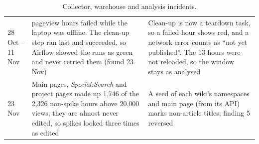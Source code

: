 \begin{table}[!h]
\begin{tabularx}{\linewidth}{l>{\raggedright\arraybackslash}X>{\raggedright\arraybackslash}X}
    28 Oct -- 11 Nov & 13 pageview hours failed while the laptop was offline. The clean-up step ran last
      and succeeded, so Airflow showed the runs as green and never retried them (found 23 Nov) & Clean-up
      is now a teardown task, so a failed hour shows red, and a network error counts as ``not yet
      published''. The 13 hours were not reloaded, so the window stays as analysed \\
    23 Nov & Main pages, \emph{Special:Search} and project pages made up 1{,}746 of the 2{,}326 non-spike
      hours above 20{,}000 views; they are almost never edited, so spikes looked three times as edited
      & A seed of each wiki's namespaces and main page (from its API) marks non-article titles; finding 5
      reversed \\
    \bottomrule
  \end{tabularx}
  \caption{Collector, warehouse and analysis incidents.}
  \label{tab:incidents}
\end{table}
